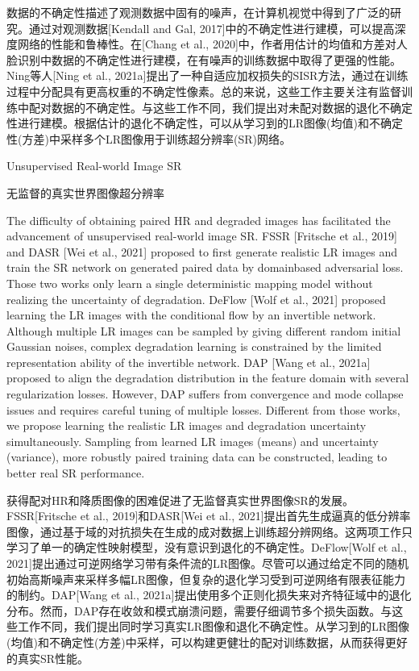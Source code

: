 数据的不确定性描述了观测数据中固有的噪声，在计算机视觉中得到了广泛的研究。通过对观测数据[Kendall and Gal, 2017]中的不确定性进行建模，可以提高深度网络的性能和鲁棒性。在[Chang et al., 2020]中，作者用估计的均值和方差对人脸识别中数据的不确定性进行建模，在有噪声的训练数据中取得了更强的性能。Ning等人[Ning et al., 2021a]提出了一种自适应加权损失的SISR方法，通过在训练过程中分配具有更高权重的不确定性像素。总的来说，这些工作主要关注有监督训练中配对数据的不确定性。与这些工作不同，我们提出对未配对数据的退化不确定性进行建模。根据估计的退化不确定性，可以从学习到的LR图像(均值)和不确定性(方差)中采样多个LR图像用于训练超分辨率(SR)网络。

Unsupervised Real-world Image SR

无监督的真实世界图像超分辨率

The difficulty of obtaining paired HR and degraded images has facilitated the advancement of unsupervised real-world image SR. FSSR [Fritsche et al., 2019] and DASR [Wei et al., 2021] proposed to first generate realistic LR images and train the SR network on generated paired data by domainbased adversarial loss. Those two works only learn a single deterministic mapping model without realizing the uncertainty of degradation. DeFlow [Wolf et al., 2021] proposed learning the LR images with the conditional flow by an invertible network. Although multiple LR images can be sampled by giving different random initial Gaussian noises, complex degradation learning is constrained by the limited representation ability of the invertible network. DAP [Wang et al., 2021a] proposed to align the degradation distribution in the feature domain with several regularization losses. However, DAP suffers from convergence and mode collapse issues and requires careful tuning of multiple losses. Different from those works, we propose learning the realistic LR images and degradation uncertainty simultaneously. Sampling from learned LR images (means) and uncertainty (variance), more robustly paired training data can be constructed, leading to better real SR performance.

获得配对HR和降质图像的困难促进了无监督真实世界图像SR的发展。FSSR[Fritsche et al., 2019]和DASR[Wei et al., 2021]提出首先生成逼真的低分辨率图像，通过基于域的对抗损失在生成的成对数据上训练超分辨网络。这两项工作只学习了单一的确定性映射模型，没有意识到退化的不确定性。DeFlow[Wolf et al., 2021]提出通过可逆网络学习带有条件流的LR图像。尽管可以通过给定不同的随机初始高斯噪声来采样多幅LR图像，但复杂的退化学习受到可逆网络有限表征能力的制约。DAP[Wang et al., 2021a]提出使用多个正则化损失来对齐特征域中的退化分布。然而，DAP存在收敛和模式崩溃问题，需要仔细调节多个损失函数。与这些工作不同，我们提出同时学习真实LR图像和退化不确定性。从学习到的LR图像(均值)和不确定性(方差)中采样，可以构建更健壮的配对训练数据，从而获得更好的真实SR性能。

